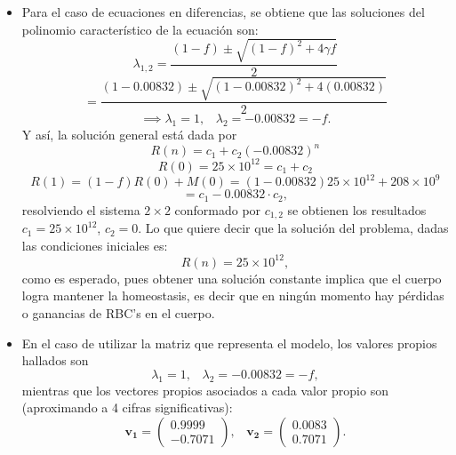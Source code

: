 \begin{itemize}
    \item Para el caso de ecuaciones en diferencias, se obtiene que las soluciones del polinomio característico de la ecuación son:
        $$\lambda_{1,2}=\dfrac{(1-f)\pm\sqrt{(1-f)^2+4\gamma f}}{2}$$
        $$=\dfrac{(1-0.00832)\pm \sqrt{(1-0.00832)^2+4(0.00832)}}{2}$$
        $$\implies \lambda_1 = 1,\;\;\; \lambda_2 = -0.00832=-f.$$
        Y así, la solución general está dada por 
        $$R(n)=c_1+c_2(-0.00832)^n$$
        $$R(0)=25\times 10^{12}=c_1+c_2$$
        $$R(1)=(1-f)R(0)+M(0)=(1-0.00832)25 \times 10^{12}+208\times 10^9$$
        $$=c_1-0.00832\cdot c_2,$$
        resolviendo el sistema $2\times 2$ conformado por $c_{1,2}$ se obtienen los resultados $c_1=25\times 10^{12}$, $c_2 = 0$. Lo que quiere decir que la solución del problema, dadas las condiciones iniciales es:
        $$R(n)=25\times 10^{12},$$
        como es esperado, pues obtener una solución constante implica que el cuerpo logra mantener la homeostasis, es decir que en ningún momento hay pérdidas o ganancias de RBC's en el cuerpo.
    \item En el caso de utilizar la matriz que representa el modelo, los valores propios hallados son
        $$\lambda_1 = 1, \;\;\; \lambda_2 = -0.00832=-f,$$
        mientras que los vectores propios asociados a cada valor propio son (aproximando a 4 cifras significativas):
        $$\mathbf{v_1}=\begin{pmatrix}
            0.9999  \\
            -0.7071
            \end{pmatrix},\;\;\;  \mathbf{v_2}=\begin{pmatrix}
            0.0083 \\
            0.7071
            \end{pmatrix}.$$

\end{itemize}

